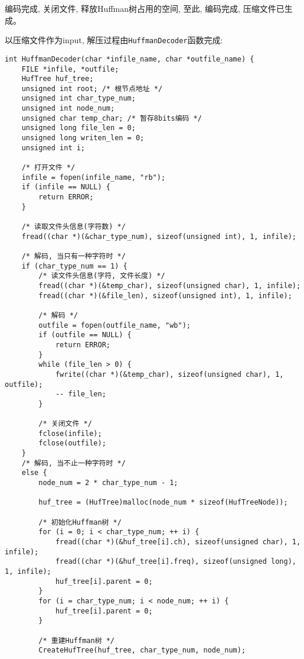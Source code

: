 \documentclass[a4paper]{ctexart}
\begin{document}
编码完成, 关闭文件, 释放Huffman树占用的空间, 至此, 编码完成, 压缩文件已生成。

以压缩文件作为input, 解压过程由\texttt{HuffmanDecoder}函数完成:

{\setmainfont{Courier New Bold}              
\begin{lstlisting}
int HuffmanDecoder(char *infile_name, char *outfile_name) {
    FILE *infile, *outfile;
    HufTree huf_tree;
    unsigned int root; /* 根节点地址 */
    unsigned int char_type_num;
    unsigned int node_num;
    unsigned char temp_char; /* 暂存8bits编码 */
    unsigned long file_len = 0;
    unsigned long writen_len = 0;
    unsigned int i;

    /* 打开文件 */
    infile = fopen(infile_name, "rb");
    if (infile == NULL) {
        return ERROR;
    }

    /* 读取文件头信息(字符数) */
    fread((char *)(&char_type_num), sizeof(unsigned int), 1, infile);

    /* 解码, 当只有一种字符时 */
    if (char_type_num == 1) {
        /* 读文件头信息(字符, 文件长度) */
        fread((char *)(&temp_char), sizeof(unsigned char), 1, infile);
        fread((char *)(&file_len), sizeof(unsigned int), 1, infile);

        /* 解码 */
        outfile = fopen(outfile_name, "wb");
        if (outfile == NULL) {
            return ERROR;
        }
        while (file_len > 0) {
            fwrite((char *)(&temp_char), sizeof(unsigned char), 1, outfile);
            -- file_len;
        }

        /* 关闭文件 */
        fclose(infile);
        fclose(outfile);
    }
    /* 解码, 当不止一种字符时 */
    else {
        node_num = 2 * char_type_num - 1;
        
        huf_tree = (HufTree)malloc(node_num * sizeof(HufTreeNode));

        /* 初始化Huffman树 */
        for (i = 0; i < char_type_num; ++ i) {
            fread((char *)(&huf_tree[i].ch), sizeof(unsigned char), 1, infile);
            fread((char *)(&huf_tree[i].freq), sizeof(unsigned long), 1, infile);
            huf_tree[i].parent = 0;
        }
        for (i = char_type_num; i < node_num; ++ i) {
            huf_tree[i].parent = 0;
        }

        /* 重建Huffman树 */
        CreateHufTree(huf_tree, char_type_num, node_num);


\end{lstlisting}}
\end{document}

